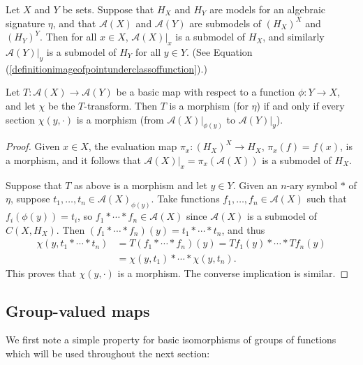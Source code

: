 \begin{proposition}\label{propositionmodelmorphism}
Let $X$ and $Y$ be sets. Suppose that $H_X$ and $H_Y$ are models for an algebraic signature $\eta$, and that $\mathcal{A}(X)$ and $\mathcal{A}(Y)$ are submodels of $(H_X)^X$ and $(H_Y)^Y$. Then for all $x\in X$, $\mathcal{A}(X)|_x$ is a submodel of $H_X$, and similarly $\mathcal{A}(Y)|_y$ is a submodel of $H_Y$ for all $y\in Y$. (See Equation (\ref{definitionimageofpointunderclassoffunction}).)

Let $T:\mathcal{A}(X)\to\mathcal{A}(Y)$ be a basic map with respect to a function $\phi:Y\to X$, and let $\chi$ be the $T$-transform. Then $T$ is a morphism (for $\eta$) if and only if every section $\chi(y,\cdot)$ is a morphism (from $\mathcal{A}(X)|_{\phi(y)}$ to $\mathcal{A}(Y)|_y$).
\end{proposition}
\begin{proof}
Given $x\in X$, the evaluation map $\pi_x:(H_X)^X\to H_X$, $\pi_x(f)=f(x)$, is a morphism, and it follows that $\mathcal{A}(X)|_x=\pi_x(\mathcal{A}(X))$ is a submodel of $H_X$.

Suppose that $T$ as above is a morphism and let $y\in Y$. Given an $n$-ary symbol $\ast$ of $\eta$, suppose $t_1,\ldots,t_n\in \mathcal{A}(X)_{\phi(y)}$. Take functions $f_1,\ldots,f_n\in\mathcal{A}(X)$ such that $f_i(\phi(y))=t_i$, so $f_1\ast\cdots\ast f_n\in\mathcal{A}(X)$ since $\mathcal{A}(X)$ is a submodel of $C(X,H_X)$. Then $(f_1*\cdots*f_n)(y)=t_1*\cdots*t_n$, and thus
\begin{align*}
\chi(y,t_1*\cdots*t_n)&=T(f_1*\cdots*f_n)(y)=Tf_1(y)*\cdots*Tf_n(y)\\
&=\chi(y,t_1)*\cdots*\chi(y,t_n).
\end{align*}
This proves that $\chi(y,\cdot)$ is a morphism. The converse implication is similar.\qedhere
\end{proof}


\subsection{Group-valued maps}\label{subsectiongroupvaluedmaps}

We first note a simple property for basic isomorphisms of groups of functions which will be used throughout the next section:

